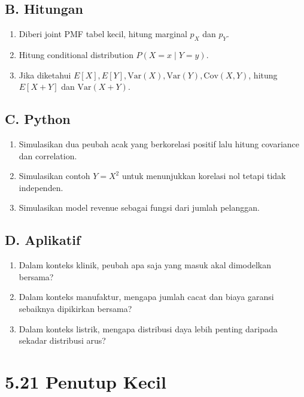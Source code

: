 \documentclass[
  letterpaper,
  DIV=11,
  numbers=noendperiod]{scrreprt}
\providecommand{\tightlist}{%
  \setlength{\itemsep}{0pt}\setlength{\parskip}{0pt}}
\begin{document}
\subsection{B. Hitungan}\label{b.-hitungan-3}

\begin{enumerate}
\def\labelenumi{\arabic{enumi}.}
\tightlist
\item
  Diberi joint PMF tabel kecil, hitung marginal \(p_X\) dan \(p_Y\).
\item
  Hitung conditional distribution \(P(X=x \mid Y=y)\).
\item
  Jika diketahui
  \(E[X], E[Y], \mathrm{Var}(X), \mathrm{Var}(Y), \mathrm{Cov}(X,Y)\),
  hitung \(E[X+Y]\) dan \(\mathrm{Var}(X+Y)\).
\end{enumerate}

\subsection{C. Python}\label{c.-python-3}

\begin{enumerate}
\def\labelenumi{\arabic{enumi}.}
\tightlist
\item
  Simulasikan dua peubah acak yang berkorelasi positif lalu hitung
  covariance dan correlation.
\item
  Simulasikan contoh \(Y=X^2\) untuk menunjukkan korelasi nol tetapi
  tidak independen.
\item
  Simulasikan model revenue sebagai fungsi dari jumlah pelanggan.
\end{enumerate}

\subsection{D. Aplikatif}\label{d.-aplikatif-3}

\begin{enumerate}
\def\labelenumi{\arabic{enumi}.}
\tightlist
\item
  Dalam konteks klinik, peubah apa saja yang masuk akal dimodelkan
  bersama?
\item
  Dalam konteks manufaktur, mengapa jumlah cacat dan biaya garansi
  sebaiknya dipikirkan bersama?
\item
  Dalam konteks listrik, mengapa distribusi daya lebih penting daripada
  sekadar distribusi arus?
\end{enumerate}

\section{5.21 Penutup Kecil}\label{penutup-kecil-4}
\end{document}
